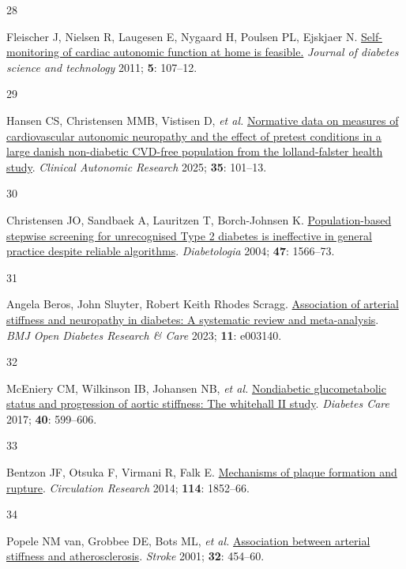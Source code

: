 \documentclass[
  a4paper,
  headsepline=true,
  open=any]{scrbook}
\newlength{\cslhangindent}
\newlength{\csllabelwidth}
\newlength{\cslentryspacingunit} %
\newenvironment{CSLReferences}[2] %
 {%
  \setlength{\parindent}{0pt}
  \ifodd #1
  \let\oldpar\par
  \def\par{\hangindent=\cslhangindent\oldpar}
  \fi
  \setlength{\parskip}{#2\cslentryspacingunit}
 }%
 {}
\newcommand{\CSLLeftMargin}[1]{\parbox[t]{\csllabelwidth}{#1}}
\newcommand{\CSLRightInline}[1]{\parbox[t]{\linewidth - \csllabelwidth}{#1}\break}
\begin{document}
\begin{CSLReferences}{0}{0}
\leavevmode{}%
\CSLLeftMargin{28 }%
\CSLRightInline{Fleischer J, Nielsen R, Laugesen E, Nygaard H, Poulsen
PL, Ejskjaer N.
\href{https://doi.org/10.1177/193229681100500115}{Self-monitoring of
cardiac autonomic function at home is feasible.} \emph{Journal of
diabetes science and technology} 2011; \textbf{5}: 107--12.}

\leavevmode{}%
\CSLLeftMargin{29 }%
\CSLRightInline{Hansen CS, Christensen MMB, Vistisen D, \emph{et al.}
\href{https://doi.org/10.1007/s10286-024-01069-6}{Normative data on
measures of cardiovascular autonomic neuropathy and the effect of
pretest conditions in a large danish non-diabetic CVD-free population
from the lolland-falster health study}. \emph{Clinical Autonomic
Research} 2025; \textbf{35}: 101--13.}

\leavevmode{}%
\CSLLeftMargin{30 }%
\CSLRightInline{Christensen JO, Sandbaek A, Lauritzen T, Borch-Johnsen
K. \href{https://doi.org/10.1007/s00125-004-1496-2}{Population-based
stepwise screening for unrecognised Type 2 diabetes is ineffective in
general practice despite reliable algorithms}. \emph{Diabetologia} 2004;
\textbf{47}: 1566--73.}

\leavevmode{}%
\CSLLeftMargin{31 }%
\CSLRightInline{Angela Beros, John Sluyter, Robert Keith Rhodes Scragg.
\href{https://doi.org/10.1136/bmjdrc-2022-003140}{Association of
arterial stiffness and neuropathy in diabetes: A systematic review and
meta-analysis}. \emph{BMJ Open Diabetes Research \& Care} 2023;
\textbf{11}: e003140.}

\leavevmode{}%
\CSLLeftMargin{32 }%
\CSLRightInline{McEniery CM, Wilkinson IB, Johansen NB, \emph{et al.}
\href{https://doi.org/10.2337/dc16-1773}{Nondiabetic glucometabolic
status and progression of aortic stiffness: The whitehall II study}.
\emph{Diabetes Care} 2017; \textbf{40}: 599--606.}

\leavevmode{}%
\CSLLeftMargin{33 }%
\CSLRightInline{Bentzon JF, Otsuka F, Virmani R, Falk E.
\href{https://doi.org/10.1161/CIRCRESAHA.114.302721}{Mechanisms of
plaque formation and rupture}. \emph{Circulation Research} 2014;
\textbf{114}: 1852--66.}

\leavevmode{}%
\CSLLeftMargin{34 }%
\CSLRightInline{Popele NM van, Grobbee DE, Bots ML, \emph{et al.}
\href{https://doi.org/10.1161/01.STR.32.2.454}{Association between
arterial stiffness and atherosclerosis}. \emph{Stroke} 2001;
\textbf{32}: 454--60.}


\end{CSLReferences}
\end{document}
